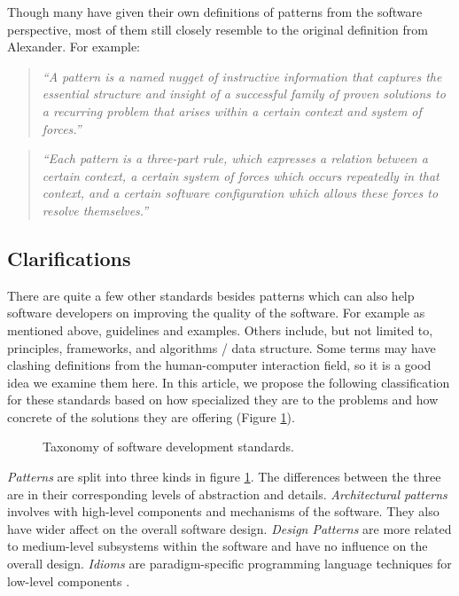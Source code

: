 \documentclass[a4paper,titlepage]{article}
\begin{document}
Though many have given their own definitions of patterns from the
software perspective, most of them still closely resemble to the
original definition from Alexander. For example:
\begin{quote}
  {\it ``A pattern is a named nugget of instructive information that
    captures the essential structure and insight of a successful
    family of proven solutions to a recurring problem that arises
    within a certain context and system of forces.''}

  \raggedleft \citet{patterns:appleton}
\end{quote}

\begin{quote}
  {\it ``Each pattern is a three-part rule, which expresses a relation
    between a certain context, a certain system of forces which occurs
    repeatedly in that context, and a certain software configuration
    which allows these forces to resolve themselves.''}

  \raggedleft \citet{timeless:gabriel}
\end{quote}

\subsection{Clarifications}
There are quite a few other standards besides patterns which can also
help software developers on improving the quality of the software. For
example as mentioned above, guidelines and examples. Others include,
but not limited to, principles, frameworks, and algorithms / data
structure. Some terms may have clashing definitions from the
human-computer interaction field, so it is a good idea we examine them
here. In this article, we propose the following classification for
these standards based on how specialized they are to the problems and
how concrete of the solutions they are offering (Figure
\ref{fig:standards}).

\begin{figure}[!t]
\centering

\caption{Taxonomy of software development standards.}
\label{fig:standards}
\end{figure}

\textit{Patterns} are split into three kinds in figure
\ref{fig:standards}. The differences between the three are in their
corresponding levels of abstraction and details. \textit{Architectural
  patterns} involves with high-level components and mechanisms of the
software. They also have wider affect on the overall software
design. \textit{Design Patterns} are more related to medium-level
subsystems within the software and have no influence on the overall
design. \textit{Idioms} are paradigm-specific programming language
techniques for low-level components \citep{patterns:buschmann}.
\end{document}
